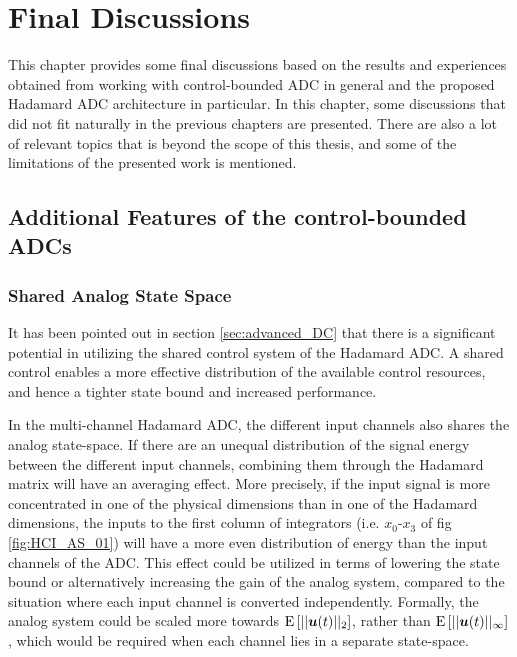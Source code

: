 
\chapter{Final Discussions}
\label{sec:final_discussion}

This chapter provides some final discussions based on the results and experiences obtained from working with control-bounded ADC in general and the proposed Hadamard ADC architecture in particular. In this chapter, some discussions that did not fit naturally in the previous chapters are presented. There are also a lot of relevant topics that is beyond the scope of this thesis, and some of the limitations of the presented work is mentioned.

\section{Additional Features of the control-bounded ADCs}
\subsection{Shared Analog State Space}
It has been pointed out in section \ref{sec:advanced_DC} that there is a significant potential in utilizing the shared control system of the Hadamard ADC. A shared control enables a more effective distribution of the available control resources, and hence a tighter state bound and increased performance.

In the multi-channel Hadamard ADC, the different input channels also shares the analog state-space. If there are an unequal distribution of the signal energy between the different input channels, combining them through the Hadamard matrix will have an averaging effect. More precisely, if the input signal is more concentrated in one of the physical dimensions than in one of the Hadamard dimensions, the inputs to the first column of integrators (i.e. $x_0$-$x_3$ of fig \ref{fig:HCI_AS_01}) will have a more even distribution of energy than the input channels of the ADC. This effect could be utilized in terms of lowering the state bound or alternatively increasing the gain of the analog system, compared to the situation where each input channel is converted independently. Formally, the analog system could be scaled more towards $\text{E}\left[ ||\bm{u}(t)||_{2} \right]$, rather than $\text{E} \left[ ||\bm{u}(t)||_{\infty} \right]$, which would be required when each channel lies in a separate state-space.

